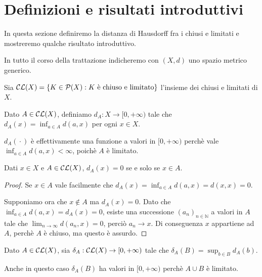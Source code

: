 \section{Definizioni e risultati introduttivi}
In questa sezione definiremo la distanza di Hausdorff fra i chiusi e limitati e mostreremo qualche risultato introduttivo.

In tutto il corso della trattazione indicheremo con $(X,d)$ uno spazio metrico generico.

\begin{definition}
	Sia $\mathcal{CL}(X)=\{K \in \mathcal{P}(X) : K \text{ è chiuso e limitato}\}$ l'insieme dei chiusi e limitati di $X$.
\end{definition}

\begin{definition}
	Dato $A\in \mathcal{CL}(X)$, definiamo $d_A: X\to [0,+\infty)$ tale che $d_A(x)=\inf_{a\in A}d(a,x)$ per ogni $x\in X$.
\end{definition}

\begin{remark}
	$d_A({}\cdot{})$ è effettivamente una funzione a valori in $[0,+\infty)$ perchè vale $\inf_{a\in A}d(a,x)<\infty$, poichè $A$ è limitato.
\end{remark}

\begin{lemma}\label{DistanzaChiusoAppartenenza}
	Dati $x\in X$ e $A \in \mathcal{CL}(X)$, $d_A(x)=0$ se e solo se $x\in A$.
\end{lemma}
\begin{proof}
	Se $x\in A$ vale facilmente che $d_A(x)=\inf_{a\in A}d(a,x)=d(x,x)=0$. 

	Supponiamo ora che $x\not\in A$ ma $d_A(x)=0$. Dato che $\inf_{a\in A}d(a,x)=d_A(x)=0$, esiste una successione $(a_n)_{n\in\mathbb{N}}$ a valori in $A$ tale che $\lim_{n\to\infty}d(a_n,x)=0$, perciò $a_n\to x$. Di conseguenza $x$ appartiene ad $A$, perchè $A$ è chiuso, ma questo è assurdo. 
\end{proof}


\begin{definition}\label{DistanzaAsimmetrica}
	Dato $A\in\mathcal{CL}(X)$, sia $\delta_A:\mathcal{CL}(X)\to [0,+\infty)$ tale che $\delta_A(B)=\sup_{b\in B} d_A(b)$.
\end{definition}
\begin{remark}
	Anche in questo caso $\delta_A(B)$ ha valori in $[0,+\infty)$ perchè $A\cup B$ è limitato.
\end{remark}

